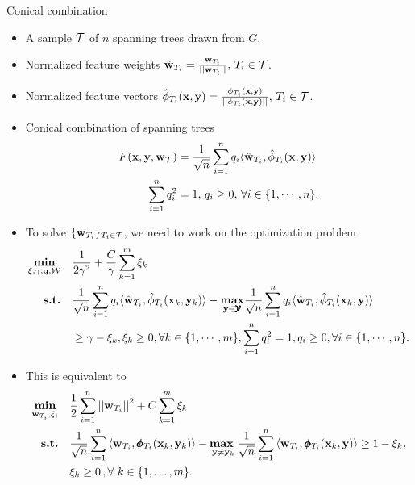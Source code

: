 \documentclass[first=dgreen,second=purple,logo=yellowexc]{aaltoslides}
\begin{document}
%
\begin{frame}[allowframebreaks]{Conical combination}
	\begin{itemize}\footnotesize
		\item A sample $\mathcal{T}$ of $n$ spanning trees drawn from $G$.
		\item Normalized feature weights $\hat{\mathbf {w}}_{T_i}=\frac{\mathbf {w}_{T_i}}{||\mathbf {w}_{T_i}||}, \, T_i\in\mathcal{T}$.
		\item Normalized feature vectors $\hat{\phi}_{T_i}(\mathbf {x},\mathbf {y})=\frac{\phi_{T_i}(\mathbf {x},\mathbf {y})}{||\phi_{T_i}(\mathbf {x},\mathbf {y})||}, \, T_i\in\mathcal{T}$.
		\item Conical combination of spanning trees
		\begin{align*}
			F(\mathbf {x},\mathbf {y},\mathbf {w}_{\mathcal{T}}) &= \frac{1}{\sqrt{n}}\sum_{i=1}^{n}q_i\langle \hat{\mathbf {w}}_{T_i}, \hat{\phi}_{T_i}(\mathbf {x},\mathbf {y}) \rangle\\
			\sum_{i=1}^{n}q_i^2 &= 1,\, q_i \ge 0,\, \forall i\in\{1,\cdots,n\}.
		\end{align*}
		\item To solve $\{\mathbf {w}_{T_i}\}_{T_i\in\mathcal{T}}$, we need to work on the optimization problem
		\begin{align*}
			\underset{\mathbf{\xi},\gamma,\mathbf {q},\mathcal{W}}{\textbf{min}} \quad& \frac{1}{2\gamma^2} + \frac{C}{\gamma}\sum_{k=1}^m\xi_k\\
			\textbf{s.t.} \quad& \frac{1}{\sqrt{n}}\sum_{i=1}^{n}q_i\langle \hat{\mathbf {w}}_{T_i}, \hat{\phi}_{T_i}(\mathbf {x}_k,\mathbf {y}_k) \rangle -\underset{\mathbf {y}\in\pmb {\mathcal{Y}}}{\textbf{max}}\frac{1}{\sqrt{n}}\sum_{i=1}^{n}q_i\langle \hat{\mathbf {w}}_{T_i}, \hat{\phi}_{T_i}(\mathbf {x}_k,\mathbf {y}) \rangle\\
			&\ge \gamma-\xi_k, \xi_k\ge 0,\forall k\in\{1,\cdots,m\},\sum_{i=1}^nq_i^2=1,q_i\ge0,\forall i\in\{1,\cdots,n\}.
		\end{align*}
		\item This is equivalent to
		\begin{align*}
			\underset{\mathbf {w}_{T_i},\xi_i}{\textbf{min}} & \quad \frac{1}{2}\sum_{i=1}^{n}\left|\left| \mathbf {w}_{T_i} \right|\right|^2 + C\sum_{k=1}^{m}\xi_k\\
			\textbf{s.t.} & \quad \frac{1}{\sqrt{n}}\sum_{i=1}^{n}{ \langle \mathbf {w}_{T_i}, \pmb \phi_{T_t}(\mathbf {x}_k,\mathbf {y}_k) \rangle} - \underset{\mathbf {y} \neq \mathbf {y}_k}{\textbf{max}\ } \frac{1}{\sqrt{n}}\sum_{i=1}^{n}{\langle \mathbf {w}_{T_t}, \pmb \phi_{T_i}(\mathbf {x}_k,\mathbf {y}) \rangle } \geq 1 -  \xi_k, \\
			& \quad \xi_k\ge0\, , \forall\ k \in \{ 1,\dots,m \}.
		\end{align*}
	\end{itemize}
\end{frame}
\end{document}
